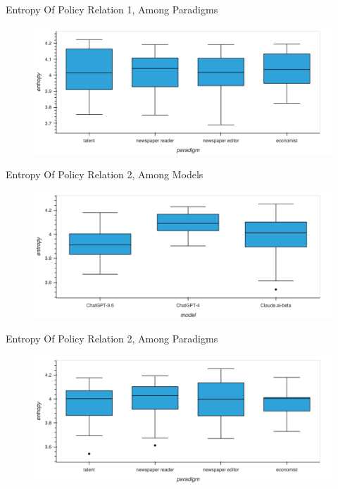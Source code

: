 \documentclass[12pt]{beamer}
\begin{document}
\begin{frame}{Entropy Of Policy Relation 1, Among Paradigms}
\begin{figure}[H]
\centering
\includegraphics[width=11.5cm]{Figures/fig16.png}
\end{figure}
\end{frame}


\begin{frame}{Entropy Of Policy Relation 2, Among Models}
\begin{figure}[H]
\centering
\includegraphics[width=11.5cm]{Figures/fig17.png}
\end{figure}
\end{frame}


\begin{frame}{Entropy Of Policy Relation 2, Among Paradigms}
\begin{figure}[H]
\centering
\includegraphics[width=11.5cm]{Figures/fig18.png}
\end{figure}
\end{frame}
\end{document}
